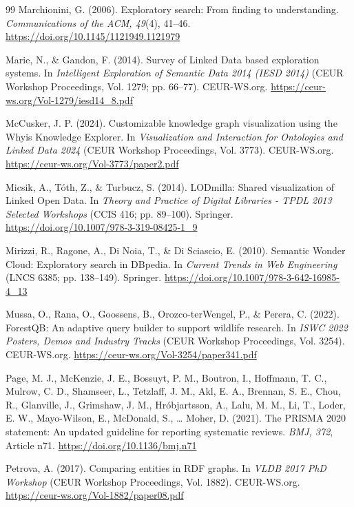 \documentclass[manuscript,review,screen]{acmart}
\begin{document}
\begin{thebibliography}{99}
 Marchionini, G. (2006). Exploratory search: From finding to understanding. \textit{Communications of the ACM, 49}(4), 41--46. \url{https://doi.org/10.1145/1121949.1121979}

 Marie, N., \& Gandon, F. (2014). Survey of Linked Data based exploration systems. In \textit{Intelligent Exploration of Semantic Data 2014 (IESD 2014)} (CEUR Workshop Proceedings, Vol. 1279; pp. 66--77). CEUR-WS.org. \url{https://ceur-ws.org/Vol-1279/iesd14_8.pdf}

 McCusker, J. P. (2024). Customizable knowledge graph visualization using the Whyis Knowledge Explorer. In \textit{Visualization and Interaction for Ontologies and Linked Data 2024} (CEUR Workshop Proceedings, Vol. 3773). CEUR-WS.org. \url{https://ceur-ws.org/Vol-3773/paper2.pdf}

 Micsik, A., T\'{o}th, Z., \& Turbucz, S. (2014). LODmilla: Shared visualization of Linked Open Data. In \textit{Theory and Practice of Digital Libraries - TPDL 2013 Selected Workshops} (CCIS 416; pp. 89--100). Springer. \url{https://doi.org/10.1007/978-3-319-08425-1_9}

 Mirizzi, R., Ragone, A., Di Noia, T., \& Di Sciascio, E. (2010). Semantic Wonder Cloud: Exploratory search in DBpedia. In \textit{Current Trends in Web Engineering} (LNCS 6385; pp. 138--149). Springer. \url{https://doi.org/10.1007/978-3-642-16985-4_13}

 Mussa, O., Rana, O., Goossens, B., Orozco-terWengel, P., \& Perera, C. (2022). ForestQB: An adaptive query builder to support wildlife research. In \textit{ISWC 2022 Posters, Demos and Industry Tracks} (CEUR Workshop Proceedings, Vol. 3254). CEUR-WS.org. \url{https://ceur-ws.org/Vol-3254/paper341.pdf}

 Page, M. J., McKenzie, J. E., Bossuyt, P. M., Boutron, I., Hoffmann, T. C., Mulrow, C. D., Shamseer, L., Tetzlaff, J. M., Akl, E. A., Brennan, S. E., Chou, R., Glanville, J., Grimshaw, J. M., Hr\'{o}bjartsson, A., Lalu, M. M., Li, T., Loder, E. W., Mayo-Wilson, E., McDonald, S., \ldots{} Moher, D. (2021). The PRISMA 2020 statement: An updated guideline for reporting systematic reviews. \textit{BMJ, 372}, Article n71. \url{https://doi.org/10.1136/bmj.n71}

 Petrova, A. (2017). Comparing entities in RDF graphs. In \textit{VLDB 2017 PhD Workshop} (CEUR Workshop Proceedings, Vol. 1882). CEUR-WS.org. \url{https://ceur-ws.org/Vol-1882/paper08.pdf}


\end{thebibliography}
\end{document}
